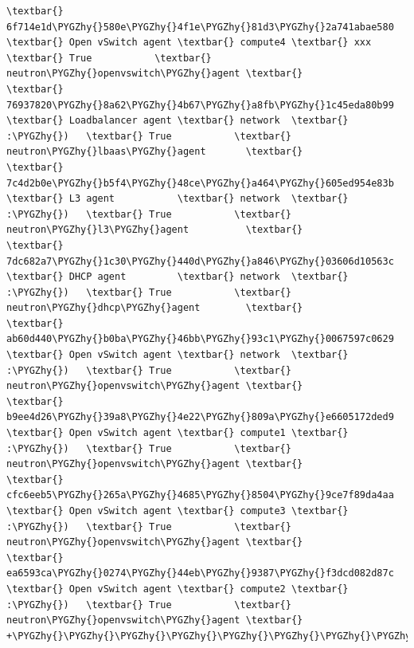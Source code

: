 \documentclass[letterpaper,10pt,english]{sphinxmanual}
\def\PYGZhy{\char`\-}
\begin{document}
\begin{enumerate}
\begin{Verbatim}[commandchars=\\\{\}]
\textbar{} 6f714e1d\PYGZhy{}580e\PYGZhy{}4f1e\PYGZhy{}81d3\PYGZhy{}2a741abae580 \textbar{} Open vSwitch agent \textbar{} compute4 \textbar{} xxx   \textbar{} True           \textbar{} neutron\PYGZhy{}openvswitch\PYGZhy{}agent \textbar{}
\textbar{} 76937820\PYGZhy{}8a62\PYGZhy{}4b67\PYGZhy{}a8fb\PYGZhy{}1c45eda80b99 \textbar{} Loadbalancer agent \textbar{} network  \textbar{} :\PYGZhy{})   \textbar{} True           \textbar{} neutron\PYGZhy{}lbaas\PYGZhy{}agent       \textbar{}
\textbar{} 7c4d2b0e\PYGZhy{}b5f4\PYGZhy{}48ce\PYGZhy{}a464\PYGZhy{}605ed954e83b \textbar{} L3 agent           \textbar{} network  \textbar{} :\PYGZhy{})   \textbar{} True           \textbar{} neutron\PYGZhy{}l3\PYGZhy{}agent          \textbar{}
\textbar{} 7dc682a7\PYGZhy{}1c30\PYGZhy{}440d\PYGZhy{}a846\PYGZhy{}03606d10563c \textbar{} DHCP agent         \textbar{} network  \textbar{} :\PYGZhy{})   \textbar{} True           \textbar{} neutron\PYGZhy{}dhcp\PYGZhy{}agent        \textbar{}
\textbar{} ab60d440\PYGZhy{}b0ba\PYGZhy{}46bb\PYGZhy{}93c1\PYGZhy{}0067597c0629 \textbar{} Open vSwitch agent \textbar{} network  \textbar{} :\PYGZhy{})   \textbar{} True           \textbar{} neutron\PYGZhy{}openvswitch\PYGZhy{}agent \textbar{}
\textbar{} b9ee4d26\PYGZhy{}39a8\PYGZhy{}4e22\PYGZhy{}809a\PYGZhy{}e6605172ded9 \textbar{} Open vSwitch agent \textbar{} compute1 \textbar{} :\PYGZhy{})   \textbar{} True           \textbar{} neutron\PYGZhy{}openvswitch\PYGZhy{}agent \textbar{}
\textbar{} cfc6eeb5\PYGZhy{}265a\PYGZhy{}4685\PYGZhy{}8504\PYGZhy{}9ce7f89da4aa \textbar{} Open vSwitch agent \textbar{} compute3 \textbar{} :\PYGZhy{})   \textbar{} True           \textbar{} neutron\PYGZhy{}openvswitch\PYGZhy{}agent \textbar{}
\textbar{} ea6593ca\PYGZhy{}0274\PYGZhy{}44eb\PYGZhy{}9387\PYGZhy{}f3dcd082d87c \textbar{} Open vSwitch agent \textbar{} compute2 \textbar{} :\PYGZhy{})   \textbar{} True           \textbar{} neutron\PYGZhy{}openvswitch\PYGZhy{}agent \textbar{}
+\PYGZhy{}\PYGZhy{}\PYGZhy{}\PYGZhy{}\PYGZhy{}\PYGZhy{}\PYGZhy{}\PYGZhy{}\PYGZhy{}\PYGZhy{}\PYGZhy{}\PYGZhy{}\PYGZhy{}\PYGZhy{}\PYGZhy{}\PYGZhy{}\PYGZhy{}\PYGZhy{}\PYGZhy{}\PYGZhy{}\PYGZhy{}\PYGZhy{}\PYGZhy{}\PYGZhy{}\PYGZhy{}\PYGZhy{}\PYGZhy{}\PYGZhy{}\PYGZhy{}\PYGZhy{}\PYGZhy{}\PYGZhy{}\PYGZhy{}\PYGZhy{}\PYGZhy{}\PYGZhy{}\PYGZhy{}\PYGZhy{}+\PYGZhy{}\PYGZhy{}\PYGZhy{}\PYGZhy{}\PYGZhy{}\PYGZhy{}\PYGZhy{}\PYGZhy{}\PYGZhy{}\PYGZhy{}\PYGZhy{}\PYGZhy{}\PYGZhy{}\PYGZhy{}\PYGZhy{}\PYGZhy{}\PYGZhy{}\PYGZhy{}\PYGZhy{}\PYGZhy{}+\PYGZhy{}\PYGZhy{}\PYGZhy{}\PYGZhy{}\PYGZhy{}\PYGZhy{}\PYGZhy{}\PYGZhy{}\PYGZhy{}\PYGZhy{}+\PYGZhy{}\PYGZhy{}\PYGZhy{}\PYGZhy{}\PYGZhy{}\PYGZhy{}\PYGZhy{}+\PYGZhy{}\PYGZhy{}\PYGZhy{}\PYGZhy{}\PYGZhy{}\PYGZhy{}\PYGZhy{}\PYGZhy{}\PYGZhy{}\PYGZhy{}\PYGZhy{}\PYGZhy{}\PYGZhy{}\PYGZhy{}\PYGZhy{}\PYGZhy{}+\PYGZhy{}\PYGZhy{}\PYGZhy{}\PYGZhy{}\PYGZhy{}\PYGZhy{}\PYGZhy{}\PYGZhy{}\PYGZhy{}\PYGZhy{}\PYGZhy{}\PYGZhy{}\PYGZhy{}\PYGZhy{}\PYGZhy{}\PYGZhy{}\PYGZhy{}\PYGZhy{}\PYGZhy{}\PYGZhy{}\PYGZhy{}\PYGZhy{}\PYGZhy{}\PYGZhy{}\PYGZhy{}\PYGZhy{}\PYGZhy{}+
\end{Verbatim}


\end{enumerate}
\end{document}
